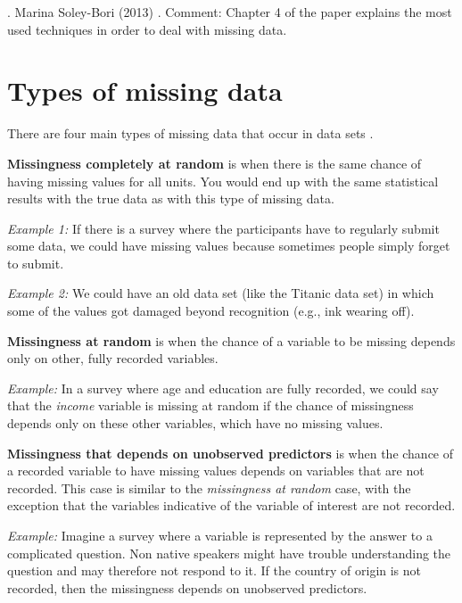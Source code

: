 \documentclass[a4paper]{article}
\begin{document}
\par{}. Marina Soley-Bori (2013) \cite{Dealingwith}.
Comment: Chapter 4 of the paper explains the most used techniques in order to deal with missing data.

\section{Types of missing data}
\par\noindent There are four main types of missing data that occur in data sets \cite{Gelmann}.\\

\par\noindent \textbf{Missingness completely at random} is when there is the same chance of having missing values for all units. You would end up with the same statistical results with the true data as with this type of missing data. 
\par\noindent \textit{Example 1:} If there is a survey where the participants have to regularly submit some data, we could have missing values because sometimes people simply forget to submit.
\par\noindent \textit{Example 2:} We could have an old data set (like the Titanic data set) in which some of the values got damaged beyond recognition (e.g., ink wearing off).\\

\par\noindent \textbf{Missingness at random} is when the chance of a variable to be missing depends only on other, fully recorded variables.
\par\noindent \textit{Example:} In a survey where age and education are fully recorded, we could say that the \textit{income} variable is missing at random if the chance of missingness depends only on these other variables, which have no missing values.\\

\par\noindent \textbf{Missingness that depends on unobserved predictors} is when the chance of a recorded variable to have missing values depends on variables that are not recorded. This case is similar to the \textit{missingness at random} case, with the exception that the variables indicative of the variable of interest are not recorded.
\par\noindent \textit{Example:} Imagine a survey where a variable is represented by the answer to a complicated question. Non native speakers might have trouble understanding the question and may therefore not respond to it. If the country of origin is not recorded, then the missingness depends on unobserved predictors.\\
\end{document}
